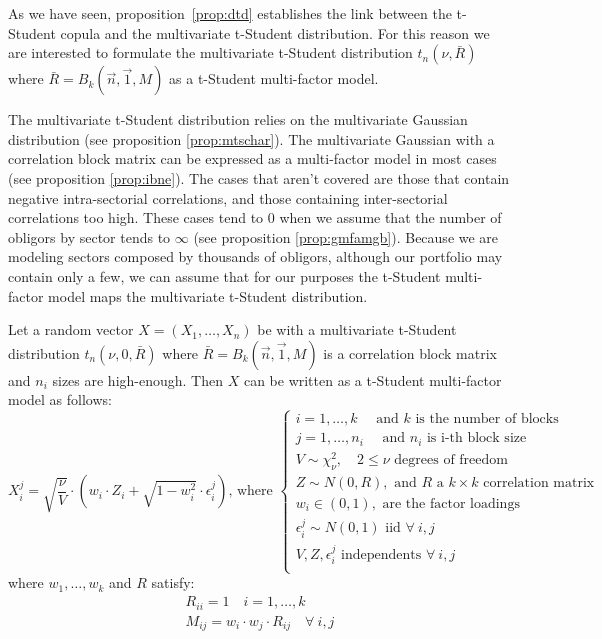 \documentclass[11pt,fleqn]{book} %
\begin{document}
As we have seen, proposition~\ref{prop:dtd} establishes the link between the 
t-Student copula and the multivariate t-Student distribution. For this reason
we are interested to formulate the multivariate t-Student distribution 
$t_n(\nu,\bar{R})$ where $\bar{R} = B_k(\vec{n},\vec{1},M)$ as a t-Student
multi-factor model.

The multivariate t-Student distribution relies on the multivariate Gaussian
distribution (see proposition \ref{prop:mtschar}). The multivariate Gaussian 
with a correlation block matrix can be expressed as a multi-factor model in 
most cases (see proposition \ref{prop:ibne}). The cases that aren't covered 
are those that contain negative intra-sectorial correlations, and those 
containing inter-sectorial correlations too high. These cases tend to $0$ 
when we assume that the number of obligors by sector tends to $\infty$
(see proposition \ref{prop:gmfamgb}). Because we are modeling 
sectors composed by thousands of obligors, although our portfolio may 
contain only a few, we can assume that for our purposes the t-Student 
multi-factor model maps the multivariate t-Student distribution.

\begin{proposition}
	\label{prop:tmfm}
	Let a random vector $X=(X_1,\dots,X_n)$ be with a multivariate t-Student 
	distribution $t_n(\nu,0,\bar{R})$ where $\bar{R} = B_k(\vec{n},\vec{1},M)$ 
	is a correlation block matrix and $n_i$ sizes are high-enough. 
	Then $X$ can be written as a t-Student multi-factor model as follows:
	\begin{displaymath}
		X_i^j = \sqrt{\frac{\nu}{V}} \cdot 
		\left( w_i \cdot Z_i + \sqrt{1-w_i^2} \cdot \epsilon_i^j \right)
		\text{, where } \left\{
		\begin{array}{l}
			i = 1, \dots, k \quad \text{ and $k$ is the number of blocks}      \\
			j = 1, \dots, n_i \quad \text{ and $n_i$ is i-th block size}       \\
			V \sim \chi_{\nu}^2, \quad 2 \le \nu \text{ degrees of freedom}    \\
			Z \sim N(0,R), \text{ and $R$ a $k {\times} k$ correlation matrix} \\
			w_i \in (0,1), \text{ are the factor loadings }                    \\
			\epsilon_i^j \sim N(0,1) \text { iid } \forall\ i,j                \\
			V, Z, \epsilon_i^j \text{ independents } \forall\ i,j              \\
		\end{array}
		\right.
	\end{displaymath}
	where $w_1,\dots,w_k$ and $R$ satisfy:
	\begin{displaymath}
		\begin{array}{l}
			R_{ii} = 1 \quad i = 1,\dots,k \\
			M_{ij} = w_i \cdot w_j \cdot R_{ij} \quad \forall\ i,j
		\end{array}
	\end{displaymath}
\end{proposition}
\end{document}
